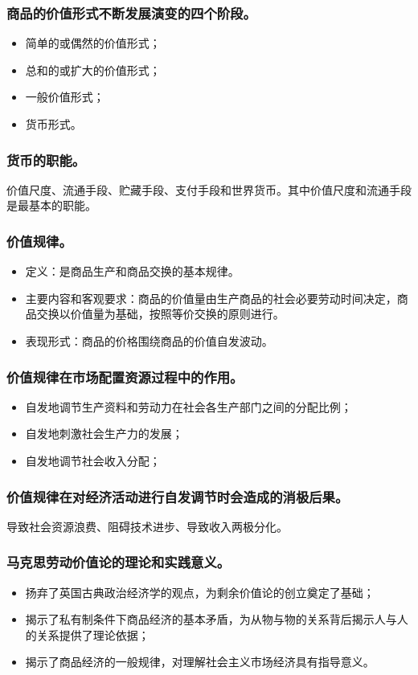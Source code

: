 \documentclass{article}
\begin{document}
\subsubsection{商品的价值形式不断发展演变的四个阶段。}
\begin{itemize}
    \item 简单的或偶然的价值形式；
    \item 总和的或扩大的价值形式；
    \item 一般价值形式；
    \item 货币形式。
\end{itemize}

\subsubsection{货币的职能。}
价值尺度、流通手段、贮藏手段、支付手段和世界货币。其中价值尺度和流通手段是最基本的职能。

\subsubsection{价值规律。}
\begin{itemize}
    \item 定义：是商品生产和商品交换的基本规律。
    \item 主要内容和客观要求：商品的价值量由生产商品的社会必要劳动时间决定，商品交换以价值量为基础，按照等价交换的原则进行。
    \item 表现形式：商品的价格围绕商品的价值自发波动。
\end{itemize}

\subsubsection{价值规律在市场配置资源过程中的作用。}
\begin{itemize}
    \item 自发地调节生产资料和劳动力在社会各生产部门之间的分配比例；
    \item 自发地刺激社会生产力的发展；
    \item 自发地调节社会收入分配；
\end{itemize}

\subsubsection{价值规律在对经济活动进行自发调节时会造成的消极后果。}
导致社会资源浪费、阻碍技术进步、导致收入两极分化。

\subsubsection{马克思劳动价值论的理论和实践意义。}
\begin{itemize}
    \item 扬弃了英国古典政治经济学的观点，为剩余价值论的创立奠定了基础；
    \item 揭示了私有制条件下商品经济的基本矛盾，为从物与物的关系背后揭示人与人的关系提供了理论依据；
    \item 揭示了商品经济的一般规律，对理解社会主义市场经济具有指导意义。
\end{itemize}
\end{document}
